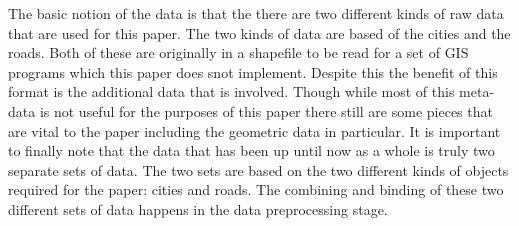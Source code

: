 \documentclass[midd]{thesis}
\newcommand{\tab}{\hspace*{2em}}
\begin{document}
\tab The basic notion of the data is that the there are two different kinds of raw data that are used for this paper. The two kinds of data are based of the cities and the roads. Both of these are originally in a shapefile to be read for a set of GIS programs which this paper does snot implement. Despite this the benefit of this format is the additional data that is involved. Though while most of this meta-data is not useful for the purposes of this paper there still are some pieces that are vital to the paper including the geometric data in particular. It is important to finally note that the data that has been up until now as a whole is truly two separate sets of data. The two sets are based on the two different kinds of objects required for the paper: cities and roads. The combining and binding of these two different sets of data happens in the data preprocessing stage.
\end{document}
